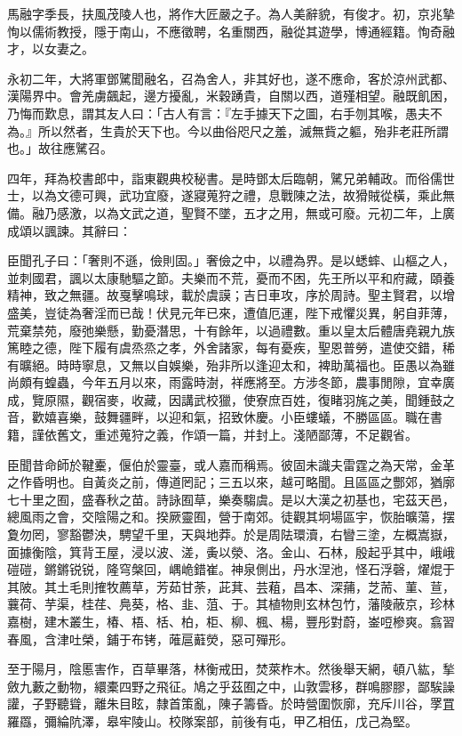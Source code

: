 
\begin{pinyinscope}
馬融字季長，扶風茂陵人也，將作大匠嚴之子。為人美辭貌，有俊才。初，京兆摯恂以儒術教授，隱于南山，不應徵聘，名重關西，融從其遊學，博通經籍。恂奇融才，以女妻之。

永初二年，大將軍鄧騭聞融名，召為舍人，非其好也，遂不應命，客於涼州武都、漢陽界中。會羌虜飆起，邊方擾亂，米穀踴貴，自關以西，道殣相望。融既飢困，乃悔而歎息，謂其友人曰：「古人有言：『左手據天下之圖，右手刎其喉，愚夫不為。』所以然者，生貴於天下也。今以曲俗咫尺之羞，滅無貲之軀，殆非老莊所謂也。」故往應騭召。

四年，拜為校書郎中，詣東觀典校秘書。是時鄧太后臨朝，騭兄弟輔政。而俗儒世士，以為文德可興，武功宜廢，遂寢蒐狩之禮，息戰陳之法，故猾賊從橫，乘此無備。融乃感激，以為文武之道，聖賢不墜，五才之用，無或可廢。元初二年，上廣成頌以諷諫。其辭曰：

臣聞孔子曰：「奢則不遜，儉則固。」奢儉之中，以禮為界。是以蟋蟀、山樞之人，並刺國君，諷以太康馳驅之節。夫樂而不荒，憂而不困，先王所以平和府藏，頤養精神，致之無疆。故戛擊鳴球，載於虞謨；吉日車攻，序於周詩。聖主賢君，以增盛美，豈徒為奢淫而已哉！伏見元年已來，遭值厄運，陛下戒懼災異，躬自菲薄，荒棄禁苑，廢弛樂懸，勤憂潛思，十有餘年，以過禮數。重以皇太后體唐堯親九族篤睦之德，陛下履有虞烝烝之孝，外舍諸家，每有憂疾，聖恩普勞，遣使交錯，稀有曠絕。時時寧息，又無以自娛樂，殆非所以逢迎太和，裨助萬福也。臣愚以為雖尚頗有蝗蟲，今年五月以來，雨露時澍，祥應將至。方涉冬節，農事閒隙，宜幸廣成，覽原隰，觀宿麥，收藏，因講武校獵，使寮庶百姓，復睹羽旄之美，聞鍾鼓之音，歡嬉喜樂，鼓舞疆畔，以迎和氣，招致休慶。小臣螻蟻，不勝區區。職在書籍，謹依舊文，重述蒐狩之義，作頌一篇，并封上。淺陋鄙薄，不足觀省。

臣聞昔命師於鞬櫜，偃伯於靈臺，或人嘉而稱焉。彼固未識夫雷霆之為天常，金革之作昏明也。自黃炎之前，傳道罔記；三五以來，越可略聞。且區區之酆郊，猶廓七十里之囿，盛春秋之苗。詩詠囿草，樂奏騶虞。是以大漢之初基也，宅茲天邑，總風雨之會，交陰陽之和。揆厥靈囿，營于南郊。徒觀其坰場區宇，恢胎曠蕩，摆夐勿罔，寥豁鬱泱，騁望千里，天與地莽。於是周阹環瀆，右矕三塗，左概嵩嶽，面據衡陰，箕背王屋，浸以波、溠，夤以滎、洛。金山、石林，殷起乎其中，峨峨磑磑，鏘鏘锐锐，隆穹槃回，嵎峗錯崔。神泉側出，丹水涅池，怪石浮磬，燿焜于其陂。其土毛則搉牧薦草，芳茹甘荼，茈萁、芸蒩，昌本、深蒱，芝荋、菫、荁，蘘荷、芋渠，桂荏、鳧葵，格、韭、菹、于。其植物則玄林包竹，藩陵蔽京，珍林嘉樹，建木叢生，椿、梧、栝、柏，柜、柳、楓、楊，豐彤對蔚，崟哣槮爽。翕習春風，含津吐榮，鋪于布铐，蓶扈蘳熒，惡可殫形。

至于陽月，陰慝害作，百草畢落，林衡戒田，焚萊柞木。然後舉天網，頓八紘，揫斂九藪之動物，繯橐四野之飛征。鳩之乎茲囿之中，山敦雲移，群鳴膠膠，鄙騃譟讙，子野聽聳，離朱目眩，隸首策亂，陳子籌昏。於時營圍恢廓，充斥川谷，罦罝羅羉，彌綸阬澤，皋牢陵山。校隊案部，前後有屯，甲乙相伍，戊己為堅。


\end{pinyinscope}
